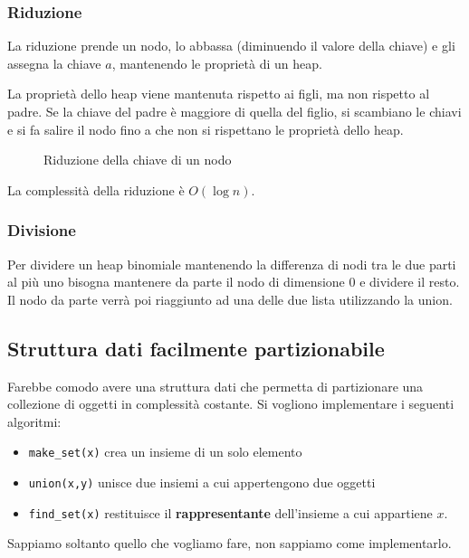 \documentclass[a4paper]{article}
\begin{document}
\subsubsection{Riduzione}
La riduzione prende un nodo, lo abbassa (diminuendo il valore della chiave) e gli assegna
la chiave \( a \), mantenendo le proprietà di un heap.

La proprietà dello heap viene mantenuta rispetto ai figli, ma non rispetto al padre. Se
la chiave del padre è maggiore di quella del figlio, si scambiano le chiavi e si fa
salire il nodo fino a che non si rispettano le proprietà dello heap.

\begin{figure}[H]
  \centering
  \caption{Riduzione della chiave di un nodo}
\end{figure}

\noindent
La complessità della riduzione è \( O(\log n) \).

\subsubsection{Divisione}
Per dividere un heap binomiale mantenendo la differenza di nodi tra le due parti al più
uno bisogna mantenere da parte il nodo di dimensione 0 e dividere il resto. Il nodo
da parte verrà poi riaggiunto ad una delle due lista utilizzando la union.

\subsection{Struttura dati facilmente partizionabile}
Farebbe comodo avere una struttura dati che permetta di partizionare una collezione
di oggetti in complessità costante. Si vogliono implementare i seguenti algoritmi:
\begin{itemize}
  \item \texttt{make\_set(x)} crea un insieme
    di un solo elemento

  \item \texttt{union(x,y)} unisce due insiemi a cui appertengono due oggetti

  \item \texttt{find\_set(x)} restituisce il \textbf{rappresentante} dell'insieme a cui 
    appartiene \( x \).
\end{itemize}
Sappiamo soltanto quello che vogliamo fare, non sappiamo come implementarlo.
\end{document}
